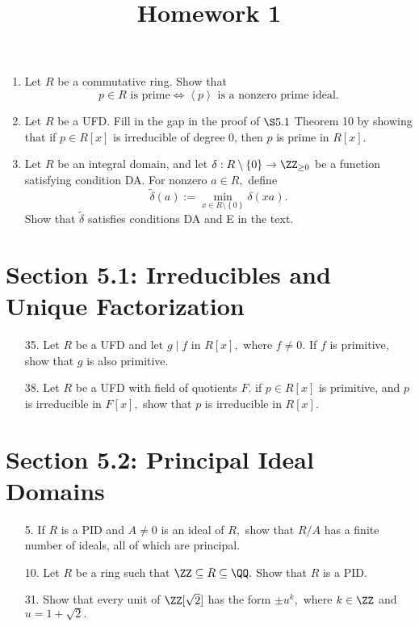 \documentclass{article}
\begin{document}
\title{Homework 1}
\maketitle
\thispagestyle{fancy}

\begin{enumerate}
	\item Let $R$ be a commutative ring. Show that
		\[p\in R\text{ is prime} \iff \left< p\right>\text{ is a nonzero prime ideal.}\]

	\item Let $R$ be a UFD. Fill in the gap in the proof of $\S5.1$ Theorem 10 by showing that if $p\in R[x]$ is irreducible of degree 0, then $p$ is prime in $R[x].$

	\item Let $R$ be an integral domain, and let $\delta:R\setminus\left\{ 0 \right\}\to\ZZ_{\ge0}$ be a function satisfying condition DA. For nonzero $a\in R,$ define
		\[\tilde{\delta}(a):=\min_{x\in R\setminus\left\{ 0 \right\}} \delta(xa).\]
		Show that $\tilde{\delta}$ satisfies conditions DA and E in the text.
		
\end{enumerate}

\section*{Section 5.1: Irreducibles and Unique Factorization}

\begin{itemize}
	\item[35.] Let $R$ be a UFD and let $g\mid f$ in $R[x],$ where $f\neq 0.$ If $f$ is primitive, show that $g$ is also primitive.

	\item[38.] Let $R$ be a UFD with field of quotients $F.$ if $p\in R[x]$ is primitive, and $p$ is irreducible in $F[x],$ show that $p$ is irreducible in $R[x].$
		
\end{itemize}

\section*{Section 5.2: Principal Ideal Domains}

\begin{itemize}
	\item[5.] If $R$ is a PID and $A\neq 0$ is an ideal of $R,$ show that $R/A$ has a finite number of ideals, all of which are principal.

	\item[10.] Let $R$ be a ring such that $\ZZ\subseteq R\subseteq \QQ.$ Show that $R$ is a PID.

	\item[31.] Show that every unit of $\ZZ[\sqrt{2}]$ has the form $\pm u^k,$ where $k\in\ZZ$ and $u=1+\sqrt{2}.$
		
\end{itemize}
\end{document}
